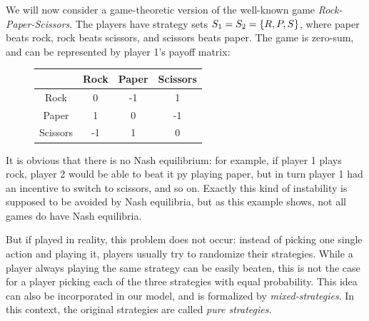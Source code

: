 \documentclass[a4paper]{scrreprt}
\begin{document}
    \begin{ex}
        We will now consider a game-theoretic version of the well-known game \emph{Rock-Paper-Scissors}.
        The players have strategy sets $S_1 = S_2 = \{R, P, S\}$, where paper beats rock, rock beats scissors, and scissors beats paper. The game is zero-sum, and can be represented by player 1's payoff matrix:
        \begin{figure}[h]
            \centering
            \begin{tabular}{c|c|c|c|}
            	         & Rock & Paper & Scissors \\ \hline
            	  Rock   &  0   &  -1   &    1     \\ \hline
            	 Paper   &  1   &   0   &    -1    \\ \hline
            	Scissors &  -1  &   1   &    0     \\ \hline
            \end{tabular}
        \end{figure}
    
        It is obvious that there is no Nash equilibrium: for example, if player 1 plays rock, player 2 would be able to beat it py playing paper, but in turn player 1 had an incentive to switch to scissors, and so on. Exactly this kind of instability is supposed to be avoided by Nash equilibria, but as this example shows, not all games do have Nash equilibria.
        
        But if played in reality, this problem does not occur: instead of picking one single action and playing it, players usually try to randomize their strategies. While a player always playing the same strategy can be easily beaten, this is not the case for a player picking each of the three strategies with equal probability. This idea can also be incorporated in our model, and is formalized by \emph{mixed-strategies}. In this context, the original strategies are called \emph{pure strategies}.
        \label{ex:rockPaperScissors}
    \end{ex}
\end{document}
